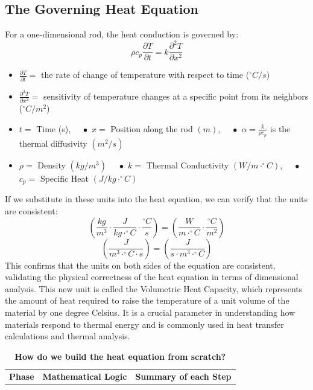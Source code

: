 \documentclass[11pt]{article}
\begin{document}
\begin{onehalfspace}
    \subsection*{The Governing Heat Equation}
    For a one-dimensional rod, the heat conduction is governed by:
    \[\rho c_p \frac{\partial T}{\partial t} = k \frac{\partial^2 T}{\partial x^2}\]
    \begin{itemize}
        \item $\frac{\partial T}{\partial t} = $ the rate of change of temperature with respect to time ($^\circ C / s$)
        \item $\frac{\partial^2 T}{\partial x^2} = $ sensitivity of temperature changes at a specific point from its neighbors ($^\circ C / m^2$)
        \item $t =$ Time (s), $\quad \bullet$ $x = $ Position along the rod $(m)$, $\quad \bullet$ $\alpha = \frac{k}{\rho c_p}$ is the thermal diffusivity $(m^2/s)$
        \item $\rho =$ Density $(kg/m^3)$ $\quad \bullet$ $k =$ Thermal Conductivity $(W/m\cdot^\circ C)$, $\quad \bullet$ $c_p =$ Specific Heat $(J/kg\cdot^\circ C)$
    \end{itemize}
    If we substitute in these units into the heat equation, we can verify that the units are consistent:
    \[\left( \frac{kg}{m^3} \cdot \frac{J}{kg\cdot^\circ C} \cdot \frac{^\circ C}{s} \right) = \left( \frac{W}{m\cdot^\circ C} \cdot \frac{^\circ C}{m^2} \right)\]
    \[\left( \frac{J}{m^3\cdot^\circ C \cdot s} \right) = \left( \frac{J}{s\cdot m^3\cdot^\circ C} \right)\]
    This confirms that the units on both sides of the equation are consistent, validating the physical correctness of the heat equation in terms of dimensional analysis.
    This new unit is called the Volumetric Heat Capacity, which represents the amount of heat required to raise the temperature of a unit volume of the material by one degree Celsius. 
    It is a crucial parameter in understanding how materials respond to thermal energy and is commonly used in heat transfer calculations and thermal analysis. 
    \begin{table}[h]
\vspace{1cm}
\captionsetup{labelformat=empty, justification=raggedright, singlelinecheck=off}
\centering
\caption{\textbf{How do we build the heat equation from scratch?}}
\label{tab:heat_derivation}
\begin{tabularx}{\textwidth}{l p{5.5cm} X} 
\toprule
\textbf{Phase} & \textbf{Mathematical Logic} & \textbf{Summary of each Step} \\

\end{tabularx}
\end{table}
\end{onehalfspace}
\end{document}
